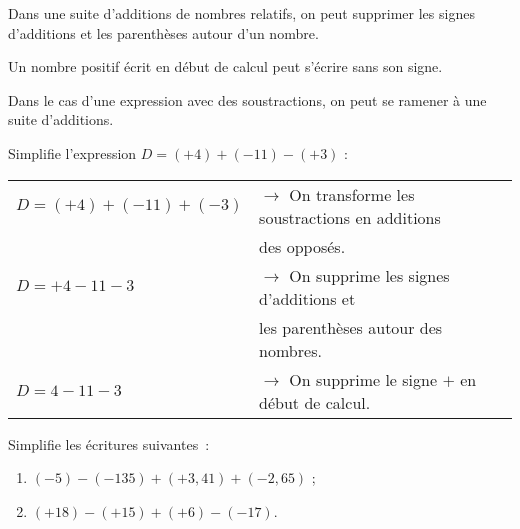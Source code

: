 
\begin{methode*1}

\begin{aconnaitre}
Dans une suite d'additions de nombres relatifs, on peut supprimer les signes d'additions et les parenthèses autour d'un nombre.

Un nombre positif écrit en début de calcul peut s'écrire sans son signe.
\end{aconnaitre}

\begin{remarque}
Dans le cas d'une expression avec des soustractions, on peut se ramener à une suite d'additions.
 \end{remarque}

 \begin{exemple*1}
Simplifie l'expression $D = (+4) + (-11) - (+3)$ :
\begin{tabular}{ll} 
$D = (+4) + (-11) + (-3)$ & $\rightarrow$ On transforme les soustractions en additions \\
 & \phantom{$\rightarrow$} des opposés. \\
$D = +4 - 11 - 3$ & $\rightarrow$ On supprime les signes d'additions et \\
 & \phantom{$\rightarrow$} les parenthèses autour des nombres. \\
$D = 4 - 11 - 3$ & $\rightarrow$ On supprime le signe $+$ en début de calcul. \\
\end{tabular}
 \end{exemple*1}

\exercice
Simplifie les écritures suivantes :
\begin{enumerate}
 \item $(-5) - (-135) + (+3,41) + (-2,65)$ ;
 \item $(+18) - (+15) + (+6) - (-17)$.
 \end{enumerate}

\end{methode*1}
